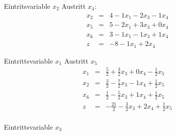 Eintritsvariable $x_2$ \tf Austritt $x_4$:
\begin{eqnarray}
x_2 &=&  4 - 1 x_1 - 2 x_3 - 1 x_4 \\
x_5 &=&  5 - 2 x_1 + 3 x_3 + 0 x_4 \\
x_6 &=&  3 - 1 x_1 - 1 x_3 + 1 x_4 \\
z   &=& -8 - 1 x_1 + 2 x_4
\end{eqnarray}

Eintrittsvariable $x_1$ \tf Austritt $x_5$
\begin{eqnarray}
x_1 &=&  \frac{5}{2} + \frac{3}{2} x_3 + 0 x_4 - \frac{1}{2} x_5 \\
x_2 &=&  \frac{3}{2} - \frac{7}{2} x_3 - 1 x_4 + \frac{1}{2} x_5 \\
x_6 &=&  \frac{1}{2} - \frac{5}{2} x_3 + 1 x_4 + \frac{1}{2} x_5 \\
z   &=&-\frac{21}{2} - \frac{3}{2} x_3 + 2 x_4 + \frac{1}{2} x_5 \\
\end{eqnarray}

Eintrittsvariable $x_3$


